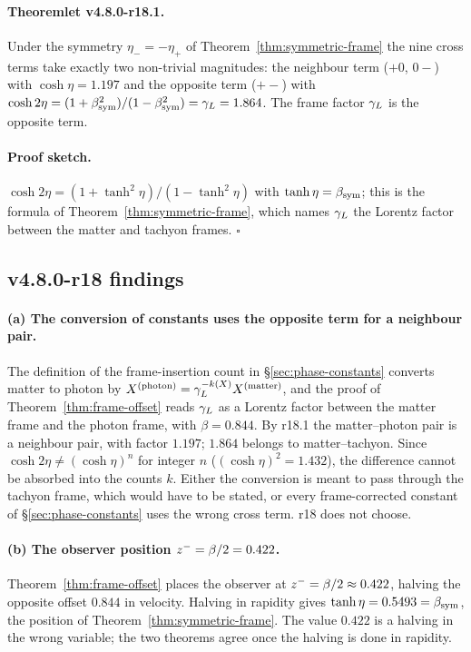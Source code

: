 \paragraph{Theoremlet v4.8.0-r18.1.}
Under the symmetry \(\eta_-=-\eta_+\) of Theorem~\ref{thm:symmetric-frame} the nine cross terms take exactly two
non-trivial magnitudes: the neighbour term (\(+0\), \(0-\)) with \(\cosh\eta=1.197\) and the opposite term (\(+-\))
with \(\cosh2\eta=(1+\beta_{\mathrm{sym}}^2)/(1-\beta_{\mathrm{sym}}^2)=\gamma_L=1.864\).  The frame factor \(\gamma_L\) is the opposite term.

\paragraph{Proof sketch.}
\(\cosh2\eta=(1+\tanh^2\eta)/(1-\tanh^2\eta)\) with \(\tanh\eta=\beta_{\mathrm{sym}}\); this is the formula of
Theorem~\ref{thm:symmetric-frame}, which names \(\gamma_L\) the Lorentz factor between the matter and tachyon frames.
\(\square\)

\subsection*{v4.8.0-r18 findings}
\label{subsec:v480-r18-findings}

\paragraph{(a) The conversion of constants uses the opposite term for a neighbour pair.}
The definition of the frame-insertion count in \S\ref{sec:phase-constants} converts matter to photon by
\(X^{(\mathrm{photon})}=\gamma_L^{-k(X)}X^{(\mathrm{matter})}\), and the proof of Theorem~\ref{thm:frame-offset} reads
\(\gamma_L\) as a Lorentz factor between the matter frame and the photon frame, with \(\beta=0.844\).  By r18.1 the
matter--photon pair is a neighbour pair, with factor \(1.197\); \(1.864\) belongs to matter--tachyon.  Since
\(\cosh2\eta\neq(\cosh\eta)^n\) for integer \(n\) (\((\cosh\eta)^2=1.432\)), the difference cannot be absorbed into the
counts \(k\).  Either the conversion is meant to pass through the tachyon frame, which would have to be stated, or
every frame-corrected constant of \S\ref{sec:phase-constants} uses the wrong cross term.  r18 does not choose.

\paragraph{(b) The observer position \(z^-=\beta/2=0.422\).}
Theorem~\ref{thm:frame-offset} places the observer at \(z^-=\beta/2\approx0.422\), halving the opposite offset
\(0.844\) in velocity.  Halving in rapidity gives \(\tanh\eta=0.5493=\beta_{\mathrm{sym}}\), the position of
Theorem~\ref{thm:symmetric-frame}.  The value \(0.422\) is a halving in the wrong variable; the two theorems agree
once the halving is done in rapidity.

